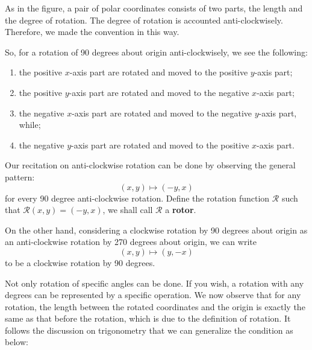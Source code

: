 \documentclass[12pt]{article}
\begin{document}
    As in the figure, a pair of polar coordinates consists of two parts, the length and the degree of rotation. The degree of rotation is accounted anti-clockwisely. Therefore, we made the convention in this way.

    So, for a rotation of 90 degrees about origin anti-clockwisely, we see the following:\begin{enumerate}
        \item the positive $x$-axis part are rotated and moved to the positive $y$-axis part;
        \item the positive $y$-axis part are rotated and moved to the negative $x$-axis part;
        \item the negative $x$-axis part are rotated and moved to the negative $y$-axis part, while;
        \item the negative $y$-axis part are rotated and moved to the positive $x$-axis part.
    \end{enumerate}
    Our recitation on anti-clockwise rotation can be done by observing the general pattern: \[(x,y)\mapsto(-y,x)\] for every 90 degree anti-clockwise rotation. Define the rotation function $\mathcal{R}$ such that $\mathcal{R}(x,y)=(-y,x)$, we shall call $\mathcal{R}$ a \textbf{rotor}.

    On the other hand, considering a clockwise rotation by 90 degrees about origin as an anti-clockwise rotation by 270 degrees about origin, we can write \[(x,y)\mapsto (y,-x)\] to be a clockwise rotation by 90 degrees.

    Not only rotation of specific angles can be done. If you wish, a rotation with any degrees can be represented by a specific operation. We now observe that for any rotation, the length between the rotated coordinates and the origin is exactly the same as that before the rotation, which is due to the definition of rotation. It follows the discussion on trigonometry that we can generalize the condition as below:
\end{document}
